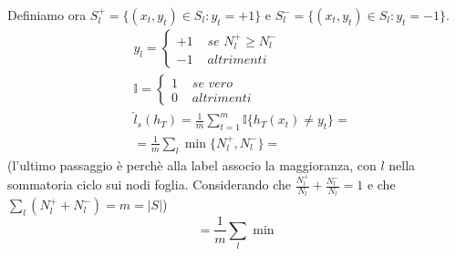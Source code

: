 \documentclass{article}
\begin{document}
Definiamo ora $S_l^+=\{ (x_t,y_t) \in S_l: y_t=+1 \}$ e $S_l^-=\{ (x_t,y_t) \in S_l: y_t=-1 \}$.
\begin{displaymath}
	\begin{split}
		& y_l=\begin{cases}
			+1 &\textit{ se } N_l^+ \geq N_l^- \\
			-1 &\textit{ altrimenti}		
		\end{cases}	\\	
		& \mathbb{I}=\begin{cases}
			1 &\textit{ se vero} \\
			0 &\textit{ altrimenti}
		\end{cases} \\
		&\hat{l}_s(h_T) = \frac{1}{m}	\sum\limits^m_{t=1} \mathbb{I} \{ h_T(x_t) \neq y_t \} =\\
		&= \frac{1}{m}\sum\limits_l \min \{ N_l^+, N_l^- \} =
	\end{split}
\end{displaymath}
(l'ultimo passaggio è perchè alla label associo la maggioranza, con $l$ nella sommatoria ciclo sui nodi foglia. Considerando che $\frac{N_l^+}{N_l}+\frac{N_l^-}{N_l}=1$ e che $\sum\limits_l (N_l^++N_l^-)=m=|S|$)
\begin{displaymath}
	= \frac{1}{m} \sum\limits_l \min
\end{displaymath}
\end{document}
